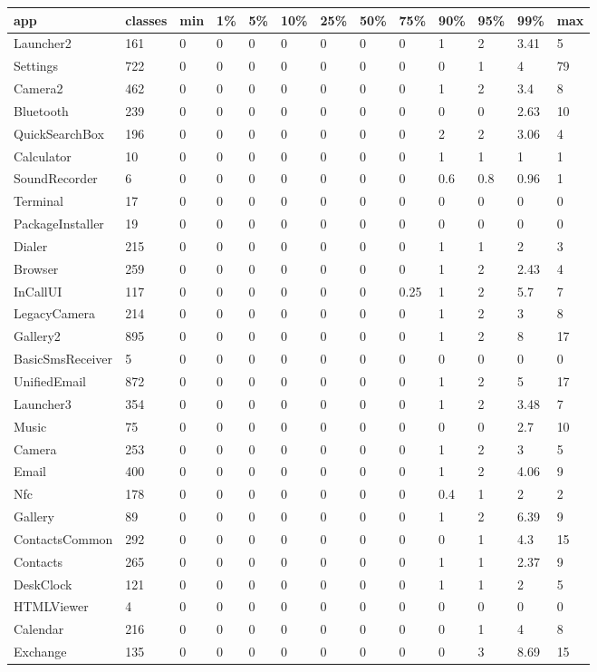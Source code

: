\begin{tabular}{|l|l|l|l|l|l|l|l|l|l|l|l|l|}
\hline
app&classes&min&1\%&5\%&10\%&25\%&50\%&75\%&90\%&95\%&99\%&max\\
\hline
Launcher2&161&0&0&0&0&0&0&0&1&2&3.41&5\\
\hline
Settings&722&0&0&0&0&0&0&0&0&1&4&79\\
\hline
Camera2&462&0&0&0&0&0&0&0&1&2&3.4&8\\
\hline
Bluetooth&239&0&0&0&0&0&0&0&0&0&2.63&10\\
\hline
QuickSearchBox&196&0&0&0&0&0&0&0&2&2&3.06&4\\
\hline
Calculator&10&0&0&0&0&0&0&0&1&1&1&1\\
\hline
SoundRecorder&6&0&0&0&0&0&0&0&0.6&0.8&0.96&1\\
\hline
Terminal&17&0&0&0&0&0&0&0&0&0&0&0\\
\hline
PackageInstaller&19&0&0&0&0&0&0&0&0&0&0&0\\
\hline
Dialer&215&0&0&0&0&0&0&0&1&1&2&3\\
\hline
Browser&259&0&0&0&0&0&0&0&1&2&2.43&4\\
\hline
InCallUI&117&0&0&0&0&0&0&0.25&1&2&5.7&7\\
\hline
LegacyCamera&214&0&0&0&0&0&0&0&1&2&3&8\\
\hline
Gallery2&895&0&0&0&0&0&0&0&1&2&8&17\\
\hline
BasicSmsReceiver&5&0&0&0&0&0&0&0&0&0&0&0\\
\hline
UnifiedEmail&872&0&0&0&0&0&0&0&1&2&5&17\\
\hline
Launcher3&354&0&0&0&0&0&0&0&1&2&3.48&7\\
\hline
Music&75&0&0&0&0&0&0&0&0&0&2.7&10\\
\hline
Camera&253&0&0&0&0&0&0&0&1&2&3&5\\
\hline
Email&400&0&0&0&0&0&0&0&1&2&4.06&9\\
\hline
Nfc&178&0&0&0&0&0&0&0&0.4&1&2&2\\
\hline
Gallery&89&0&0&0&0&0&0&0&1&2&6.39&9\\
\hline
ContactsCommon&292&0&0&0&0&0&0&0&0&1&4.3&15\\
\hline
Contacts&265&0&0&0&0&0&0&0&1&1&2.37&9\\
\hline
DeskClock&121&0&0&0&0&0&0&0&1&1&2&5\\
\hline
HTMLViewer&4&0&0&0&0&0&0&0&0&0&0&0\\
\hline
Calendar&216&0&0&0&0&0&0&0&0&1&4&8\\
\hline
Exchange&135&0&0&0&0&0&0&0&0&3&8.69&15\\
\hline
\end{tabular}
